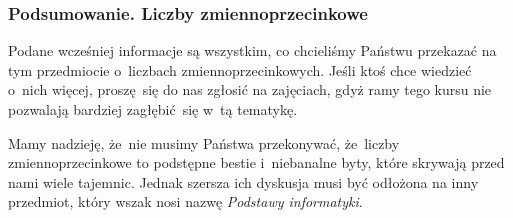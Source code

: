 \documentclass[10pt,t]{beamer}
\begin{document}
\begin{frame}
  \frametitle{Podsumowanie. Liczby zmiennoprzecinkowe}


  Podane wcześniej informacje są wszystkim, co chcieliśmy Państwu przekazać
  na tym przedmiocie o~liczbach zmiennoprzecinkowych. Jeśli ktoś chce
  wiedzieć o~nich więcej, proszę~się do nas zgłosić na zajęciach, gdyż
  ramy tego kursu nie pozwalają bardziej zagłębić~się w~tą tematykę.

  Mamy nadzieję, że~nie musimy Państwa przekonywać, że~liczby
  zmiennoprzecinkowe to podstępne bestie i~niebanalne byty, które
  skrywają przed nami wiele tajemnic. Jednak szersza ich dyskusja musi
  być odłożona na inny przedmiot, który wszak nosi nazwę
  \textit{Podstawy informatyki}.

\end{frame}




































\printbibliography





\end{document}
